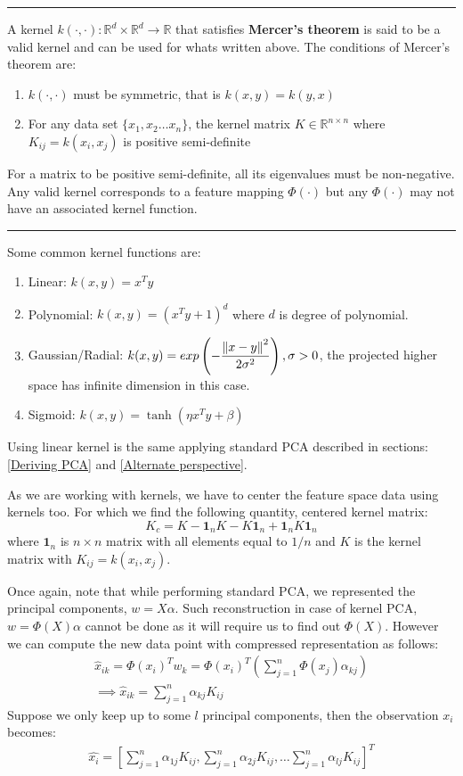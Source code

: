 \documentclass[12pt,a4paper]{article}
\begin{document}
\par\noindent\rule{\textwidth}{0.4pt}
A kernel $k(\cdot,\cdot): \mathbb{R}^d\times \mathbb{R}^d \rightarrow \mathbb{R}$  that satisfies \textbf{Mercer's theorem} is said to be a valid kernel and can be used for whats written above. The conditions of Mercer's theorem are:
\begin{enumerate}
    \item $k(\cdot,\cdot)$ must be symmetric, that is $k(x,y) = k(y,x)$
    \item For any data set $\{x_1,x_2 \dots x_n\}$, the kernel matrix $K \in \mathbb{R}^{n\times n}$ where $K_{ij} = k(x_i,x_j)$ is positive semi-definite
\end{enumerate}
For a matrix to be positive semi-definite, all its eigenvalues must be non-negative. Any valid kernel corresponds to a feature mapping $\Phi(\cdot)$ but any $\Phi(\cdot)$ may not have an associated kernel function.
\par\noindent\rule{\textwidth}{0.4pt}

Some common kernel functions are:
\begin{enumerate}
    \item Linear: $k(x,y) = x^Ty$ 
    \item Polynomial: $k(x,y) = (x^Ty+1)^d$ where $d$ is degree of polynomial.
    \item Gaussian/Radial: $k(x,y) = exp\left(- \dfrac{\norm{x-y}^2}{2\sigma^2}\right), \sigma>0$, the projected higher space has infinite dimension in this case.
    \item Sigmoid: $k(x,y) = \tanh(\eta x^Ty+ \beta)$
\end{enumerate}
Using linear kernel is the same applying standard PCA described in sections: \ref{Deriving PCA} and \ref{Alternate perspective}.

As we are working with kernels, we have to center the feature space data using kernels too. For which we find the following quantity, centered kernel matrix: $$K_c = K - \textbf{1}_n K -K \textbf{1}_n + \textbf{1}_n K\textbf{1}_n$$ where $\textbf{1}_n$ is $n\times n$ matrix with all elements equal to $1/n$ and $K$ is the kernel matrix with $K_{ij}=k(x_i,x_j)$.

Once again, note that while performing standard PCA, we represented the principal components, $w=X\alpha$. Such reconstruction in case of kernel PCA, $w=\Phi(X) \alpha$ cannot be done as it will require us to find out $\Phi(X)$. However we can compute the new data point with compressed representation as follows: 
\begin{gather}
    \hat{x}_{ik} = \Phi(x_i)^Tw_k = \Phi(x_i)^T(\sum_{j=1}^n \Phi(x_j) \alpha_{kj}) \nonumber \\
    \implies \hat{x}_{ik} = \sum_{j=1}^n \alpha_{kj} K_{ij}
\end{gather}
Suppose we only keep up to some $l$ principal components, then the observation $x_i$ becomes:
\begin{gather}
    \hat{x_i} = \left[ \sum_{j=1}^n \alpha_{1j} K_{ij}, \sum_{j=1}^n \alpha_{2j} K_{ij} , \dots \sum_{j=1}^n \alpha_{lj} K_{ij} \right]^T
\end{gather}
\end{document}
